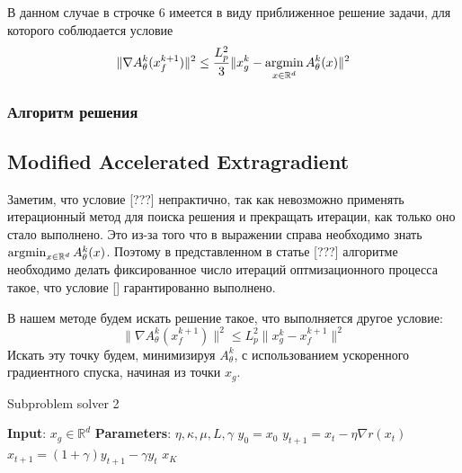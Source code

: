 \documentclass[a4paper,12pt]{extarticle}
\newcommand{\argmin}{\mathop{\rm argmin}}
\newcommand{\norm}[1]{\|#1\|}
\newcommand{\sqn}[1]{\norm{#1}^2}
\begin{document}
В данном случае в строчке 6 имеется в виду приближенное решение задачи, для которого соблюдается условие 
\[	\sqn{\nabla A_\theta^k(x_f^{k+1})} \leq  \frac{L_p^2}{3}\sqn{x_g^k- \argmin_{x \in \R^d} A_\theta^k(x)}\]

\subsubsection{Алгоритм решения}

\subsection{Modified Accelerated Extragradient}
Заметим, что условие [???] непрактично, так как невозможно применять итерационный метод 
для поиска решения и прекращать итерации, как только оно стало выполнено. Это из-за того 
что в выражении справа необходимо знать $\argmin_{x \in \R^d} A_\theta^k(x)$. Поэтому 
в представленном в статье [???] алгоритме необходимо делать фиксированное число итераций 
оптмизационного процесса такое, что условие [] гарантированно выполнено. 

В нашем методе будем искать решение такое, что выполняется другое условие:
\[	\sqn{\nabla A_\theta^k(x_f^{k+1})} \leq  L_p^2 \sqn{x_g^k- x_f^{k+1}} \]
Искать эту точку будем, минимизируя $A_{\theta}^k$, с использованием ускоренного градиентного спуска,
начиная из точки $x_g$.



\begin{algorithm}[]
    \caption{Subproblem solver 2}
    \begin{algorithmic}[1]

    \STATE{} \textbf{Input}: $x_g \in \mathbb{R}^d$
    \STATE{} \textbf{Parameters}: $\eta, \kappa, \mu, L, \gamma$
    \STATE{} $y_0 = x_0$
    \vspace{0.5ex}
    \vspace{0.5ex}
    \STATE{} $y_{t + 1} = x_{t} - \eta \nabla r(x_t)$
    \STATE{} $x_{t + 1} = (1 + \gamma)y_{t+1} - \gamma y_{t}$
    \vspace{0.5ex}
    \ENDFOR{}
    \RETURN{} $x_{K}$
    \end{algorithmic}
\end{algorithm}




\subsection{}
\end{document}
